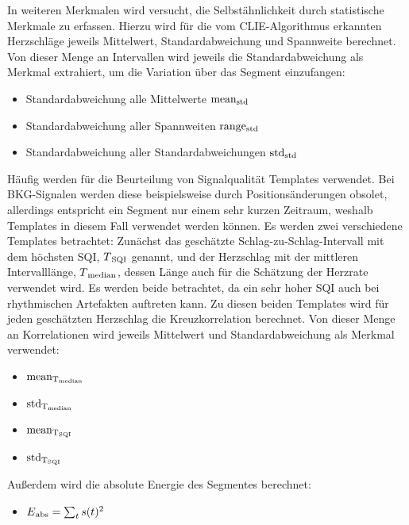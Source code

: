 In weiteren Merkmalen wird versucht, die Selbstähnlichkeit durch statistische Merkmale zu erfassen. Hierzu wird für die vom \ac{CLIE}-Algorithmus erkannten Herzschläge jeweils Mittelwert, Standardabweichung und Spannweite berechnet. Von dieser Menge an Intervallen wird jeweils die Standardabweichung als Merkmal extrahiert, um die Variation über das Segment einzufangen:
\begin{itemize}
	\item Standardabweichung alle Mittelwerte $\text{mean}\textsubscript{std}$
	\item Standardabweichung aller Spannweiten $\text{range}\textsubscript{std}$
	\item Standardabweichung aller Standardabweichungen $\text{std}\textsubscript{std}$
\end{itemize}

Häufig werden für die Beurteilung von Signalqualität Templates verwendet. Bei \ac{BKG}-Signalen werden diese beispielsweise durch Positionsänderungen obsolet, allerdings entspricht ein Segment nur einem sehr kurzen Zeitraum, weshalb Templates in diesem Fall verwendet werden können. Es werden zwei verschiedene Templates betrachtet: Zunächst das geschätzte Schlag-zu-Schlag-Intervall mit dem höchsten \ac{SQI}, $T\textsubscript{SQI}$ genannt, und der Herzschlag mit der mittleren Intervalllänge, $T\textsubscript{median}$, dessen Länge auch für die Schätzung der Herzrate verwendet wird. Es werden beide betrachtet, da ein sehr hoher \ac{SQI} auch bei rhythmischen Artefakten auftreten kann. Zu diesen beiden Templates wird für jeden geschätzten Herzschlag die Kreuzkorrelation berechnet. Von dieser Menge an Korrelationen wird jeweils Mittelwert und Standardabweichung als Merkmal verwendet:
\begin{itemize}
	\item $\text{mean}\textsubscript{T\textsubscript{median}}$
	\item $\text{std}\textsubscript{T\textsubscript{median}}$
	\item $\text{mean}\textsubscript{T\textsubscript{SQI}}$
	\item $\text{std}\textsubscript{T\textsubscript{SQI}}$
\end{itemize}

Außerdem wird die absolute Energie des Segmentes berechnet:
\begin{itemize}
	\item $E\textsubscript{abs} = \sum_{t} s(t)^2$
\end{itemize}


